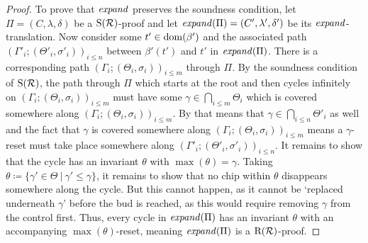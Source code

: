 \begin{proof}
  To prove that $\mathit{expand}$ preserves the soundness condition, let $\Pi = (C,
  \lambda, \delta)$ be a
  $\mathrm{S}(\mathcal{R})$-proof and let $\mathit{expand}(\Pi) = (C', \lambda', \delta')$ be its
  $\mathit{expand}$-translation. Now consider some $t' \in \mathrm{dom}(\beta')$ and the
  associated path $(\Gamma'_i; (\Theta'_i, \sigma'_i))_{i \leq n}$ between $\beta'(t')$ and
  $t'$ in $\mathit{expand}(\Pi)$. There is a corresponding path $(\Gamma_i ; (\Theta_i,
  \sigma_i))_{i \leq m}$ through $\Pi$. By the soundness condition of $\mathrm{S}(\mathcal{R})$,
  the path through $\Pi$ which starts at the root and then cycles
  infinitely on $(\Gamma_i ; (\Theta_i, \sigma_i))_{i \leq m}$ must have some
  $\gamma \in \bigcap_{i \leq m} \Theta_i$ which is covered somewhere along
  $(\Gamma_i ; (\Theta_i, \sigma_i))_{i \leq m}$. By  that
  means that $\gamma \in \bigcap_{i \leq n} \Theta'_i$ as well and the fact that
  $\gamma$ is covered somewhere along $(\Gamma_i ; (\Theta_i, \sigma_i))_{i \leq
    m}$ means a $\gamma$-reset must take place somewhere along $(\Gamma'_i;
  (\Theta'_i, \sigma'_i))_{i \leq n}$. It remains to show that the cycle has an
  invariant $\theta$ with $\max(\theta) = \gamma$.
  Taking $\theta \coloneq \{\gamma' \in \Theta ~|~ \gamma' \leq
  \gamma\}$, it remains to show that no
  chip within $\theta$ disappears somewhere along the cycle. But this cannot
  happen, as it cannot be `replaced underneath $\gamma$' before the bud is
  reached, as this would require removing $\gamma$ from the control first.
  Thus, every cycle in $\mathit{expand}(\Pi)$ has an invariant $\theta$ with an
  accompanying $\max(\theta)$-reset, meaning $\mathit{expand}(\Pi)$ is a $\mathrm{R}(\mathcal{R})$-proof.
\end{proof}

